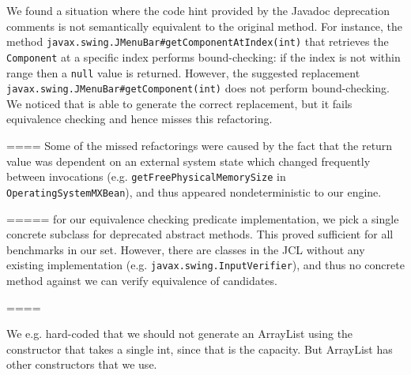 \documentclass[sigconf]{acmart}
\begin{document}

% 
%

%

We found a situation where the code hint provided by the Javadoc deprecation comments is
not semantically equivalent to the original method. For instance, the method \lstinline{javax.swing.JMenuBar#getComponentAtIndex(int)}
that retrieves the \lstinline{Component} at a specific index performs bound-checking: if the index is not within
range then a \lstinline{null} value is returned. However, the suggested replacement \lstinline{javax.swing.JMenuBar#getComponent(int)}
does not perform bound-checking. We noticed that \llm is able to generate the correct replacement, but
it fails equivalence checking and hence misses this refactoring.

====
Some of the missed refactorings were caused by the fact that the return
value was dependent on an external system state which changed frequently between
invocations (e.g. \lstinline[breaklines=true]{getFreePhysicalMemorySize} in \lstinline[breaklines=true]{OperatingSystemMXBean}),
and thus appeared nondeterministic to our engine.

=====
for our equivalence checking predicate implementation, we pick a single
concrete subclass for deprecated abstract methods. This proved sufficient for
all benchmarks in our set. However,
there are classes in the JCL without any
existing implementation (e.g. \lstinline{javax.swing.InputVerifier}),  and thus no concrete
method against we can verify equivalence of candidates.

====

We e.g. hard-coded that we should not generate an ArrayList using the constructor that takes a single int, since that is the capacity. But ArrayList has other constructors that we use.

\fi
\end{document}
